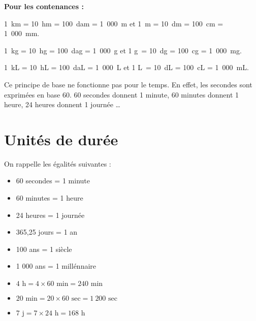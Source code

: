 \documentclass[11pt]{article}
\begin{document}
\textbf{Pour les contenances :}
\begin{center}
\end{center}

\begin{exemple}
1\ km = 10\ hm = 100\ dam = 1\ 000\ m et 1\ m = 10\ dm = 100\ cm = 1\
000\ mm.

1\ kg = 10\ hg = 100\ dag = 1\ 000\ g et 1 g\ = 10\ dg = 100\ cg = 1\
000\ mg.

1\ kL = 10\ hL = 100\ daL = 1\ 000\ L et 1 L\ = 10\ dL = 100\ cL = 1\
000\ mL.
\end{exemple}

\begin{remarque}
Ce principe de base ne fonctionne pas pour le temps. En effet, les
secondes sont exprimées en base 60. 60 secondes donnent 1 minute, 60
minutes donnent 1 heure, 24 heures donnent 1 journée \dots
\end{remarque}

\section{Unités de durée}

\begin{propriete}
On rappelle les égalités suivantes :
\begin{itemize}
\item 60 secondes = 1 minute
\item 60 minutes = 1 heure
\item 24 heures = 1 journée
\item 365,25 jours = 1 an
\item 100 ans = 1 siècle
\item 1 000 ans = 1 millénnaire
\end{itemize}
\end{propriete}


\begin{exemple}
\phantom{0} \vspace{-.5cm}
\begin{itemize}
\item $4\text{ h} = 4 \times 60 \text{ min} = 240 \text{ min}$
\item $20 \text{ min} = 20 \times 60 \text{ sec} = 1~200 \text{ sec}$
\item $7 \text{ j} = 7 \times 24 \text{ h} = 168 \text{ h}$
\end{itemize}
\end{exemple}
\end{document}
